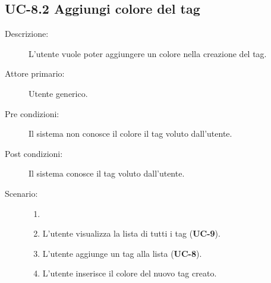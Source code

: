 \subsection{UC-8.2 Aggiungi colore del tag}
\begin{description}
    \item[Descrizione:] L’utente vuole poter aggiungere un colore nella creazione del tag.
    \item[Attore primario:] Utente generico.
    \item[Pre condizioni:] Il sistema non conosce il colore il tag voluto dall’utente.
    \item[Post condizioni:] Il sistema conosce il tag voluto dall’utente.
    \item[Scenario:]
    \begin{enumerate}
        \item[]
        \item L’utente visualizza la lista di tutti i tag (\textbf{UC-9}).
        \item L'utente aggiunge un tag alla lista (\textbf{UC-8}).
        \item L'utente inserisce il colore del nuovo tag creato.
    \end{enumerate}
\end{description}

